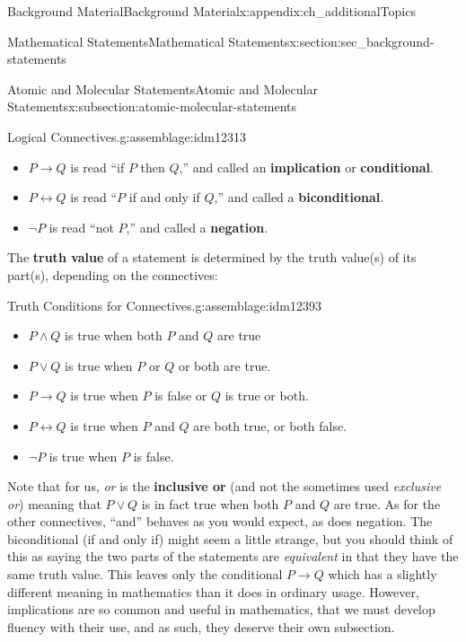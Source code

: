 \documentclass[oneside,10pt,]{book}
\newcommand{\terminology}[1]{\textbf{#1}}
\numberwithin{equation}{chapter}
\def\iff{\leftrightarrow}
\def\imp{\rightarrow}
\begin{document}
\begin{appendixptx}{Background Material}{}{Background Material}{}{}{x:appendix:ch_additionalTopics}
\begin{sectionptx}{Mathematical Statements}{}{Mathematical Statements}{}{}{x:section:sec_background-statements}
\begin{subsectionptx}{Atomic and Molecular Statements}{}{Atomic and Molecular Statements}{}{}{x:subsection:atomic-molecular-statements}
\begin{assemblage}{Logical Connectives.}{g:assemblage:idm12313}
\begin{itemize}[label=\textbullet]
\item{}\(P \imp Q\) is read ``if \(P\) then \(Q\),'' and called an \terminology{implication} or \terminology{conditional}.    %
\item{}\(P \iff Q\) is read ``\(P\) if and only if \(Q\),'' and called a \terminology{biconditional}.   %
\item{}\(\neg P\) is read ``not \(P\),'' and called a \terminology{negation}.  \label{g:notation:idm12388}%
\end{itemize}
%
\end{assemblage}
The \terminology{truth value} of a statement is determined by the truth value(s) of its part(s), depending on the connectives:%
\begin{assemblage}{Truth Conditions for Connectives.}{g:assemblage:idm12393}%
%
\begin{itemize}[label=\textbullet]
\item{}\(P \wedge Q\) is true when both \(P\) and \(Q\) are true%
\item{}\(P \vee Q\) is true when \(P\) or \(Q\) or both are true.%
\item{}\(P \imp Q\) is true when \(P\) is false or \(Q\) is true or both.%
\item{}\(P \iff Q\) is true when \(P\) and \(Q\) are both true, or both false.%
\item{}\(\neg P\) is true when \(P\) is false.%
\end{itemize}
%
\end{assemblage}
Note that for us, \emph{or} is the \terminology{inclusive or}  (and not the sometimes used \emph{exclusive or}) meaning that \(P \vee Q\) is in fact true when both \(P\) and \(Q\) are true. As for the other connectives, ``and'' behaves as you would expect, as does negation. The biconditional (if and only if) might seem a little strange, but you should think of this as saying the two parts of the statements are \emph{equivalent} in that they have the same truth value. This leaves only the conditional \(P \imp Q\) which has a slightly different meaning in mathematics than it does in ordinary usage. However, implications are so common and useful in mathematics, that we must develop fluency with their use, and as such, they deserve their own subsection.%
\end{subsectionptx}

\end{sectionptx}
\end{appendixptx}
\end{document}
